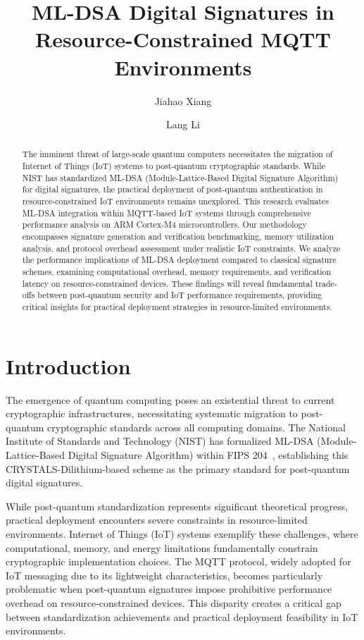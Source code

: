 \documentclass[journal=tches,final]{iacrtrans}
\author{Jiahao Xiang\inst{1} \and Lang Li\inst{1}}
\institute{
  Hengyang Normal University, College of Computer Science and Technology, Hengyang, China
}
\title[ML-DSA Digital Signatures in Resource-Constrained MQTT Environments]{ML-DSA Digital Signatures in Resource-Constrained MQTT Environments}
\begin{document}
\maketitle


\begin{abstract}
  The imminent threat of large-scale quantum computers necessitates the migration of Internet of Things (IoT) systems to post-quantum cryptographic standards. While NIST has standardized ML-DSA (Module-Lattice-Based Digital Signature Algorithm) for digital signatures, the practical deployment of post-quantum authentication in resource-constrained IoT environments remains unexplored. This research evaluates ML-DSA integration within MQTT-based IoT systems through comprehensive performance analysis on ARM Cortex-M4 microcontrollers. Our methodology encompasses signature generation and verification benchmarking, memory utilization analysis, and protocol overhead assessment under realistic IoT constraints. We analyze the performance implications of ML-DSA deployment compared to classical signature schemes, examining computational overhead, memory requirements, and verification latency on resource-constrained devices. These findings will reveal fundamental trade-offs between post-quantum security and IoT performance requirements, providing critical insights for practical deployment strategies in resource-limited environments.
\end{abstract}

\color{blue}

\section{Introduction}

The emergence of quantum computing poses an existential threat to current cryptographic infrastructures, necessitating systematic migration to post-quantum cryptographic standards across all computing domains. The National Institute of Standards and Technology (NIST) has formalized ML-DSA (Module-Lattice-Based Digital Signature Algorithm) within FIPS 204~\cite{NIST-FIPS-204}, establishing this CRYSTALS-Dilithium-based scheme as the primary standard for post-quantum digital signatures.

While post-quantum standardization represents significant theoretical progress, practical deployment encounters severe constraints in resource-limited environments. Internet of Things (IoT) systems exemplify these challenges, where computational, memory, and energy limitations fundamentally constrain cryptographic implementation choices. The MQTT protocol, widely adopted for IoT messaging due to its lightweight characteristics, becomes particularly problematic when post-quantum signatures impose prohibitive performance overhead on resource-constrained devices. This disparity creates a critical gap between standardization achievements and practical deployment feasibility in IoT environments.
\end{document}
